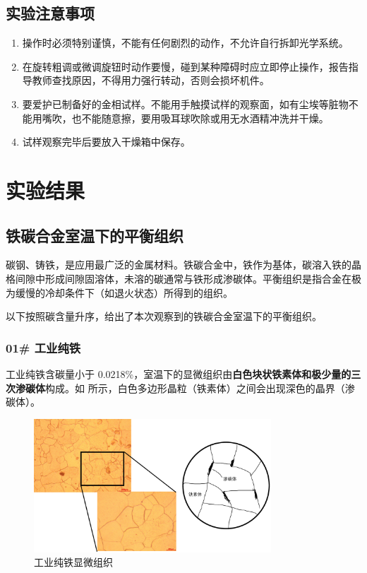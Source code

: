 \documentclass[a4paper,utf8]{article}
\begin{document}
    \subsection{实验注意事项}
        \begin{enumerate}
            \item 操作时必须特别谨慎，不能有任何剧烈的动作，不允许自行拆卸光学系统。
            \item 在旋转粗调或微调旋钮时动作要慢，碰到某种障碍时应立即停止操作，报告指导教师查找原因，不得用力强行转动，否则会损坏机件。
            \item 要爱护已制备好的金相试样。不能用手触摸试样的观察面，如有尘埃等脏物不能用嘴吹，也不能随意擦，要用吸耳球吹除或用无水酒精冲洗并干燥。
            \item 试样观察完毕后要放入干燥箱中保存。
        \end{enumerate}
\section{实验结果}
    \subsection{铁碳合金室温下的平衡组织}
        碳钢、铸铁，是应用最广泛的金属材料。铁碳合金中，铁作为基体，碳溶入铁的晶格间隙中形成间隙固溶体，未溶的碳通常与铁形成渗碳体。平衡组织是指合金在极为缓慢的冷却条件下（如退火状态）所得到的组织。\par
        以下按照碳含量升序，给出了本次观察到的铁碳合金室温下的平衡组织。
        \subsubsection{01\# 工业纯铁}
            工业纯铁含碳量小于 0.0218\%，室温下的显微组织由\textbf{白色块状铁素体和极少量的三次渗碳体}构成。如 所示，白色多边形晶粒（铁素体）之间会出现深色的晶界（渗碳体）。
            \begin{figure}[!ht]
                \includegraphics[height=50mm]{result/1.pdf}
                \caption{工业纯铁显微组织\label{fig:1}}
            \end{figure}
\end{document}
